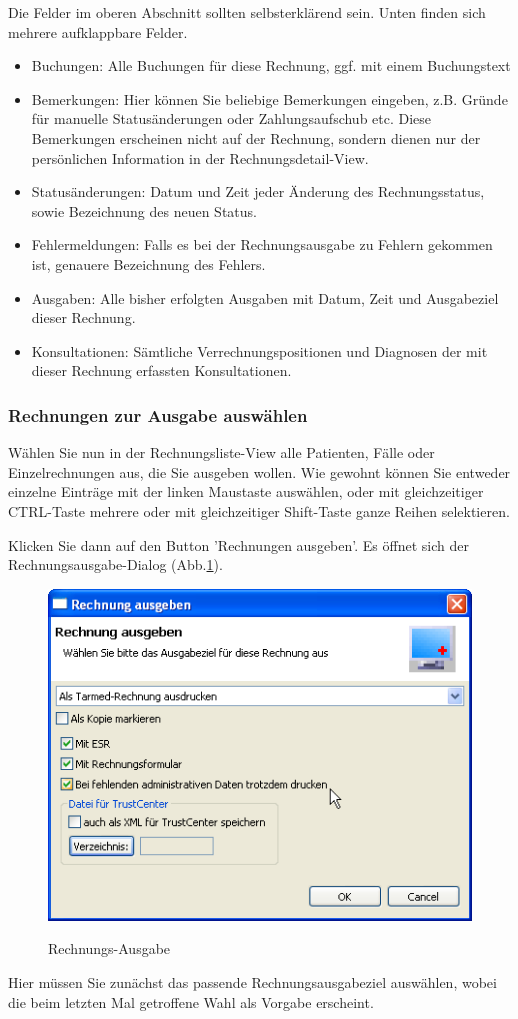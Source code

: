\documentclass[a4paper]{scrartcl}
\begin{document}
Die Felder im oberen Abschnitt sollten selbsterklärend sein. Unten finden sich mehrere aufklappbare Felder.
\begin{itemize}
\item Buchungen: Alle Buchungen für diese Rechnung, ggf. mit einem Buchungstext
\item Bemerkungen: Hier können Sie beliebige Bemerkungen eingeben, z.B. Gründe für manuelle Statusänderungen oder Zahlungsaufschub etc. Diese Bemerkungen erscheinen nicht auf der Rechnung, sondern dienen nur der persönlichen Information in der Rechnungsdetail-View.
\item Statusänderungen: Datum und Zeit jeder Änderung des Rechnungsstatus, sowie Bezeichnung des neuen Status.
\item Fehlermeldungen: Falls es bei der Rechnungsausgabe zu Fehlern gekommen ist, genauere Bezeichnung des Fehlers.
\item Ausgaben: Alle bisher erfolgten Ausgaben mit Datum, Zeit und Ausgabeziel dieser Rechnung.
\item Konsultationen: Sämtliche Verrechnungspositionen und Diagnosen der mit dieser Rechnung erfassten Konsultationen.
\end{itemize}

\subsubsection{Rechnungen zur Ausgabe auswählen}
Wählen Sie nun in der Rechnungsliste-View alle Patienten, Fälle oder Einzelrechnungen aus, die Sie ausgeben wollen. Wie gewohnt können Sie entweder einzelne Einträge mit der linken Maustaste auswählen, oder mit gleichzeitiger CTRL-Taste mehrere oder mit gleichzeitiger Shift-Taste ganze Reihen selektieren.

\medskip

Klicken Sie dann auf den Button 'Rechnungen ausgeben'. Es öffnet sich der Rechnungsausgabe-Dialog (Abb.\ref{fig:abr14}).
\begin{figure}
  \includegraphics{abr14}\\
  \caption{Rechnungs-Ausgabe}\label{fig:abr14}
\end{figure}
Hier müssen Sie zunächst das passende Rechnungsausgabeziel auswählen, wobei die beim letzten Mal getroffene Wahl als Vorgabe erscheint.
\end{document}

